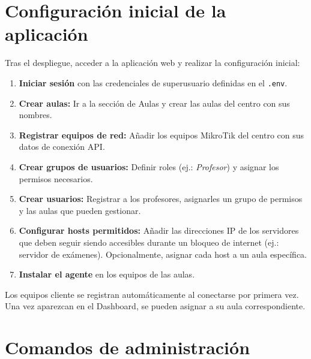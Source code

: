 \documentclass[12pt,a4paper]{article}
\begin{document}
\section{Configuración inicial de la aplicación}

Tras el despliegue, acceder a la aplicación web y realizar la configuración inicial:

\begin{enumerate}
    \item \textbf{Iniciar sesión} con las credenciales de superusuario definidas en el \texttt{.env}.
    \item \textbf{Crear aulas:} Ir a la sección de Aulas y crear las aulas del centro con sus nombres.
    \item \textbf{Registrar equipos de red:} Añadir los equipos MikroTik del centro con sus datos de conexión API.
    \item \textbf{Crear grupos de usuarios:} Definir roles (ej.: \textit{Profesor}) y asignar los permisos necesarios.
    \item \textbf{Crear usuarios:} Registrar a los profesores, asignarles un grupo de permisos y las aulas que pueden gestionar.
    \item \textbf{Configurar hosts permitidos:} Añadir las direcciones IP de los servidores que deben seguir siendo accesibles durante un bloqueo de internet (ej.: servidor de exámenes). Opcionalmente, asignar cada host a un aula específica.
    \item \textbf{Instalar el agente} en los equipos de las aulas.
\end{enumerate}

Los equipos cliente se registran automáticamente al conectarse por primera vez. Una vez aparezcan en el Dashboard, se pueden asignar a su aula correspondiente.

\section{Comandos de administración}
\end{document}
